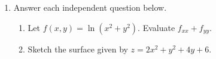 \documentclass[a4paper, 12pt]{article}
\renewcommand{\headrulewidth}{0pt}
\begin{document}
\begin{enumerate}[leftmargin=*,label=\textbf{\arabic*.}]
\item Answer each independent question below.
\begin{enumerate}[leftmargin=*,label=\textbf{\alph*.}]
\item Let $f(x,y)=\ln\left(x^2+y^2\right)$. Evaluate $f_{xx}+f_{yy}$.
\item Sketch the surface given by $z=2x^2+y^2+4y+6$.
\end{enumerate}

\end{enumerate}

\newpage
\pagestyle{fancy}
\renewcommand{\headrulewidth}{1pt}

\end{document}
